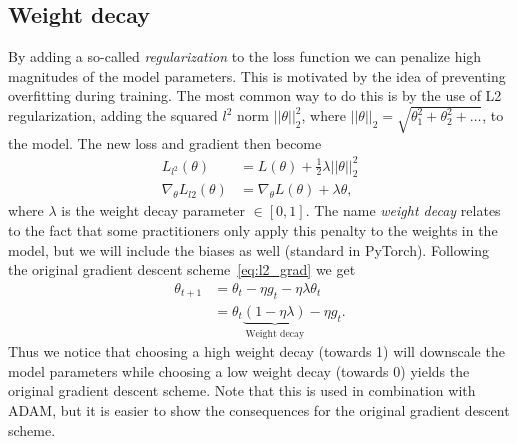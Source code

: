 \subsection{Weight decay}
By adding a so-called \textit{regularization} to the loss function we can penalize high magnitudes of the model parameters. This is motivated by the idea of preventing overfitting during training. The most common way to do this is by the use of L2 regularization, adding the squared $l^2$ norm $||\theta||_2^2$, where $||\theta||_2 = \sqrt{\theta_1^2 + \theta_2^2 + \ldots}$, to the model. The new loss and gradient then become
\begin{align}
  L_{l^2}(\theta) &= L(\theta) + \frac{1}{2}\lambda ||\theta||^2_2 \nonumber \\
  \nabla_\theta L_{l2}(\theta) &=  \nabla_\theta L(\theta) + \lambda \theta,
  \label{eq:l2_grad}
\end{align}
where $\lambda$ is the weight decay parameter $\in [0,1]$. The name \textit{weight decay} relates to the fact that some practitioners only apply this penalty to the weights in the model, but we will include the biases as well (standard in PyTorch). Following the original gradient descent scheme~\cref{eq:l2_grad} we get
\begin{align*}
  \theta_{t+1} &= \theta_t - \eta g_t - \eta\lambda \theta_t \\
  &= \theta_t\underbrace{(1-\eta\lambda)}_{\text{Weight decay}} - \eta g_t.
\end{align*}
Thus we notice that choosing a high weight decay (towards 1) will downscale the model parameters while choosing a low weight decay (towards 0) yields the original gradient descent scheme. Note that this is used in combination with ADAM, but it is easier to show the consequences for the original gradient descent scheme.  



